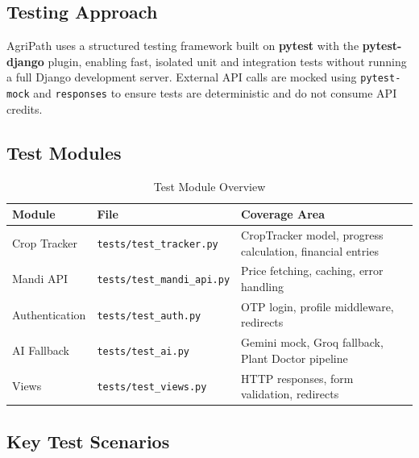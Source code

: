 \documentclass[12pt,a4paper]{article}
\begin{document}
\subsection*{Testing Approach}

AgriPath uses a structured testing framework built on \textbf{pytest} with the \textbf{pytest-django} plugin, enabling fast, isolated unit and integration tests without running a full Django development server. External API calls are mocked using \texttt{pytest-mock} and \texttt{responses} to ensure tests are deterministic and do not consume API credits.

\subsection*{Test Modules}

\begin{table}[h]
\caption{Test Module Overview}
\centering
\begin{tabular}{|l|l|p{5.5cm}|}
\hline
\textbf{Module} & \textbf{File} & \textbf{Coverage Area} \\ \hline
Crop Tracker & \texttt{tests/test\_tracker.py} & CropTracker model, progress calculation, financial entries \\ \hline
Mandi API & \texttt{tests/test\_mandi\_api.py} & Price fetching, caching, error handling \\ \hline
Authentication & \texttt{tests/test\_auth.py} & OTP login, profile middleware, redirects \\ \hline
AI Fallback & \texttt{tests/test\_ai.py} & Gemini mock, Groq fallback, Plant Doctor pipeline \\ \hline
Views & \texttt{tests/test\_views.py} & HTTP responses, form validation, redirects \\ \hline
\end{tabular}
\end{table}

\subsection*{Key Test Scenarios}
\end{document}
